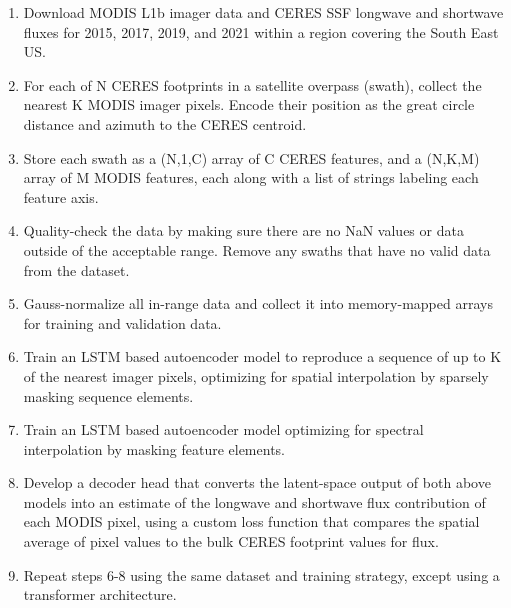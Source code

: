 \documentclass[12pt]{article}
\begin{document}
\begin{enumerate}[itemsep=0pt, parsep=0pt, before=\setlength{\baselineskip}{6mm}]
    \item Download MODIS L1b imager data and CERES SSF longwave and shortwave fluxes for 2015, 2017, 2019, and 2021 within a region covering the South East US.
    \item For each of N CERES footprints in a satellite overpass (swath), collect the nearest K MODIS imager pixels. Encode their position as the great circle distance and azimuth to the CERES centroid.
    \item Store each swath as a (N,1,C) array of C CERES features, and a (N,K,M) array of M MODIS features, each along with a list of strings labeling each feature axis.
    \item Quality-check the data by making sure there are no NaN values or data outside of the acceptable range. Remove any swaths that have no valid data from the dataset.
    \item Gauss-normalize all in-range data and collect it into memory-mapped arrays for training and validation data.
    \item Train an LSTM based autoencoder model to reproduce a sequence of up to K of the nearest imager pixels, optimizing for spatial interpolation by sparsely masking sequence elements.
    \item Train an LSTM based autoencoder model optimizing for spectral interpolation by masking feature elements.
    \item Develop a decoder head that converts the latent-space output of both above models into an estimate of the longwave and shortwave flux contribution of each MODIS pixel, using a custom loss function that compares the spatial average of pixel values to the bulk CERES footprint values for flux.
    \item Repeat steps 6-8 using the same dataset and training strategy, except using a transformer architecture.
\end{enumerate}


\newpage


\end{document}
